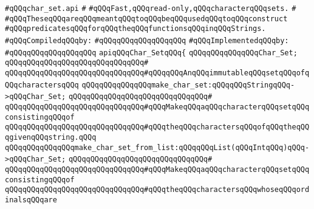 \label{src/lib/std/src/char-set.api}
\verb|#qQQqchar_set.api|\newline
\verb|#|\newline
\verb|#qQQqFast,qQQqread-only,qQQqcharacterqQQqsets.|\newline
\verb|#|\newline
\verb|#qQQqTheseqQQqareqQQqmeantqQQqtoqQQqbeqQQqusedqQQqtoqQQqconstruct|\newline
\verb|#qQQqpredicatesqQQqforqQQqtheqQQqfunctionsqQQqinqQQqStrings.|\newline
\newline
\verb|#qQQqCompiledqQQqby:|\newline
\verb|#qQQqqQQqqQQqqQQqqQQq|\newline
\newline
\verb|#qQQqImplementedqQQqby:|\newline
\verb|#qQQqqQQqqQQqqQQqqQQq|\newline
\newline
\verb|apiqQQqChar_SetqQQq{|\newline
\newline
\verb|qQQqqQQqqQQqqQQqChar_Set;|\newline
\verb|qQQqqQQqqQQqqQQqqQQqqQQqqQQqqQQq#|\newline
\verb|qQQqqQQqqQQqqQQqqQQqqQQqqQQqqQQq#qQQqqQQqAnqQQqimmutableqQQqsetqQQqofqQQqcharactersqQQq|\newline
\newline
\verb|qQQqqQQqqQQqqQQqmake_char_set:qQQqqQQqStringqQQq->qQQqChar_Set;|\newline
\verb|qQQqqQQqqQQqqQQqqQQqqQQqqQQqqQQq#|\newline
\verb|qQQqqQQqqQQqqQQqqQQqqQQqqQQqqQQq#qQQqMakeqQQqaqQQqcharacterqQQqsetqQQqconsistingqQQqof|\newline
\verb|qQQqqQQqqQQqqQQqqQQqqQQqqQQqqQQq#qQQqtheqQQqcharactersqQQqofqQQqtheqQQqgivenqQQqstring.qQQq|\newline
\newline
\verb|qQQqqQQqqQQqqQQqmake_char_set_from_list:qQQqqQQqList(qQQqIntqQQq)qQQq->qQQqChar_Set;|\newline
\verb|qQQqqQQqqQQqqQQqqQQqqQQqqQQqqQQq#|\newline
\verb|qQQqqQQqqQQqqQQqqQQqqQQqqQQqqQQq#qQQqMakeqQQqaqQQqcharacterqQQqsetqQQqconsistingqQQqof|\newline
\verb|qQQqqQQqqQQqqQQqqQQqqQQqqQQqqQQq#qQQqtheqQQqcharactersqQQqwhoseqQQqordinalsqQQqare|\newline
